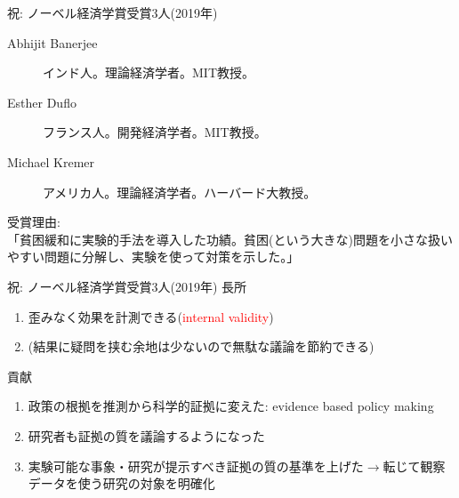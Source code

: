 \begin{frame}{祝: ノーベル経済学賞受賞3人(2019年)}
\begin{description}
\vspace{1.0ex}\setlength{\itemsep}{1.0ex}\setlength{\baselineskip}{12pt}
\item[Abhijit Banerjee]	インド人。理論経済学者。MIT教授。
\item[Esther Duflo]	フランス人。開発経済学者。MIT教授。
\item[Michael Kremer]	アメリカ人。理論経済学者。ハーバード大教授。
\end{description}
\vspace{2ex}
受賞理由: \\
「貧困緩和に実験的手法を導入した功績。貧困(という大きな)問題を小さな扱いやすい問題に分解し、実験を使って対策を示した。」
\end{frame}
\begin{frame}{祝: ノーベル経済学賞受賞3人(2019年)}
長所
\begin{enumerate}
\vspace{1.0ex}\setlength{\itemsep}{1.0ex}\setlength{\baselineskip}{12pt}
\pause
\item	歪みなく効果を計測できる(\textcolor{red}{internal validity})
\pause
\item	(結果に疑問を挟む余地は少ないので無駄な議論を節約できる)
\end{enumerate}
\vspace{2ex}
\pause
貢献
\begin{enumerate}
\vspace{1.0ex}\setlength{\itemsep}{1.0ex}\setlength{\baselineskip}{12pt}
\item	政策の根拠を推測から科学的証拠に変えた: evidence based policy making
\pause
\item	研究者も証拠の質を議論するようになった
\pause
\item	実験可能な事象・研究が提示すべき証拠の質の基準を上げた$\rightarrow$転じて観察データを使う研究の対象を明確化
\end{enumerate}
\end{frame}
